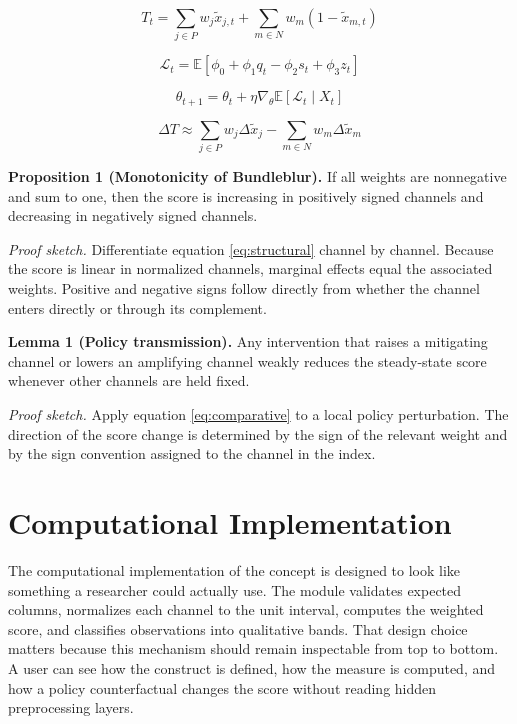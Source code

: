\documentclass[12pt]{article}
\begin{document}
\begin{equation}
T_t = \sum_{j \in P} w_j \tilde{x}_{j,t} + \sum_{m \in N} w_m (1 - \tilde{x}_{m,t})
\label{eq:structural}
\end{equation}

\begin{equation}
\mathcal{L}_t = \mathbb{E}\left[\phi_0 + \phi_1 q_t - \phi_2 s_t + \phi_3 z_t\right]
\label{eq:loss}
\end{equation}

\begin{equation}
\theta_{t+1} = \theta_t + \eta \nabla_\theta \mathbb{E}[\mathcal{L}_t \mid X_t]
\label{eq:update}
\end{equation}

\begin{equation}
\Delta T \approx \sum_{j \in P} w_j \Delta \tilde{x}_j - \sum_{m \in N} w_m \Delta \tilde{x}_m
\label{eq:comparative}
\end{equation}

\textbf{Proposition 1 (Monotonicity of Bundleblur).} If all weights are nonnegative and sum to one, then the score is increasing in positively signed channels and decreasing in negatively signed channels.

\textit{Proof sketch.} Differentiate equation \eqref{eq:structural} channel by channel. Because the score is linear in normalized channels, marginal effects equal the associated weights. Positive and negative signs follow directly from whether the channel enters directly or through its complement.

\textbf{Lemma 1 (Policy transmission).} Any intervention that raises a mitigating channel or lowers an amplifying channel weakly reduces the steady-state score whenever other channels are held fixed.

\textit{Proof sketch.} Apply equation \eqref{eq:comparative} to a local policy perturbation. The direction of the score change is determined by the sign of the relevant weight and by the sign convention assigned to the channel in the index.

\section{Computational Implementation}
The computational implementation of the concept is designed to look like something a researcher could actually use. The module validates expected columns, normalizes each channel to the unit interval, computes the weighted score, and classifies observations into qualitative bands. That design choice matters because this mechanism should remain inspectable from top to bottom. A user can see how the construct is defined, how the measure is computed, and how a policy counterfactual changes the score without reading hidden preprocessing layers.
\end{document}
